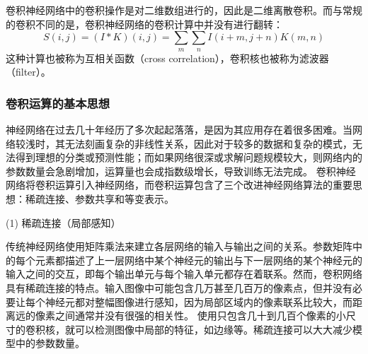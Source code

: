 卷积神经网络中的卷积操作是对二维数组进行的，因此是二维离散卷积。而与常规的卷积不同的是，卷积神经网络的卷积计算中并没有进行翻转：
%
\begin{equation}
S(i,j) = (I*K)(i,j) = \sum\limits_{m} \sum\limits_{n} I(i+m,j+n)K(m,n)
\end{equation}
这种计算也被称为互相关函数（cross correlation），卷积核也被称为滤波器（filter）。

\subsubsection{卷积运算的基本思想}
神经网络在过去几十年经历了多次起起落落，是因为其应用存在着很多困难。当网络较浅时，其无法刻画复杂的非线性关系，因此对于较多的数据和复杂的模式，无法得到理想的分类或预测性能；而如果网络很深或求解问题规模较大，则网络内的参数数量会急剧增加，运算量也会成指数级增长，导致训练无法完成。
卷积神经网络将卷积运算引入神经网络，而卷积运算包含了三个改进神经网络算法的重要思想：稀疏连接、参数共享和等变表示。

(1) 稀疏连接（局部感知）

传统神经网络使用矩阵乘法来建立各层网络的输入与输出之间的关系。参数矩阵中的每个元素都描述了上一层网络中某个神经元的输出与下一层网络的某个神经元的输入之间的交互，即每个输出单元与每个输入单元都存在着联系。然而，卷积网络具有稀疏连接的特点。输入图像中可能包含几万甚至几百万的像素点，但并没有必要让每个神经元都对整幅图像进行感知，因为局部区域内的像素联系比较大，而距离远的像素之间通常并没有很强的相关性。
使用只包含几十到几百个像素的小尺寸的卷积核，就可以检测图像中局部的特征，如边缘等。稀疏连接可以大大减少模型中的参数数量。

